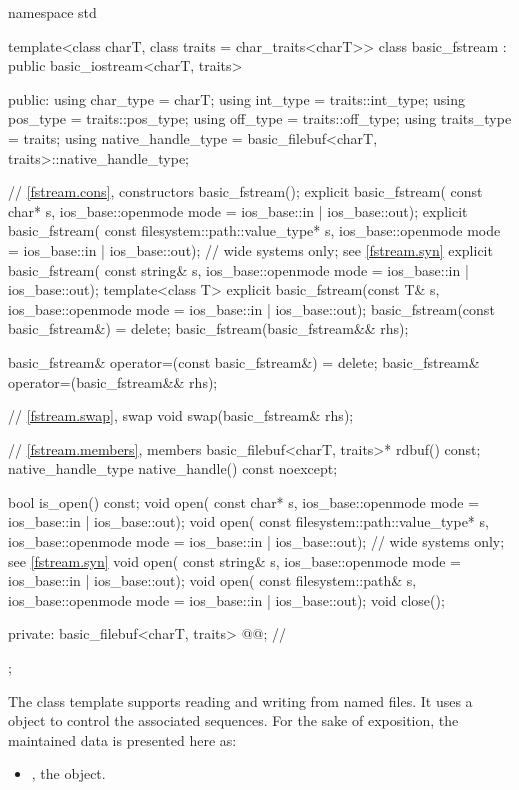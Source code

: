 %
\begin{codeblock}
namespace std {
  template<class charT, class traits = char_traits<charT>>
  class basic_fstream : public basic_iostream<charT, traits> {
  public:
    using char_type   = charT;
    using int_type    = traits::int_type;
    using pos_type    = traits::pos_type;
    using off_type    = traits::off_type;
    using traits_type = traits;
    using native_handle_type = basic_filebuf<charT, traits>::native_handle_type;

    // \ref{fstream.cons}, constructors
    basic_fstream();
    explicit basic_fstream(
      const char* s,
      ios_base::openmode mode = ios_base::in | ios_base::out);
    explicit basic_fstream(
      const filesystem::path::value_type* s,
      ios_base::openmode mode = ios_base::in | ios_base::out);  // wide systems only; see \ref{fstream.syn}
    explicit basic_fstream(
      const string& s,
      ios_base::openmode mode = ios_base::in | ios_base::out);
    template<class T>
      explicit basic_fstream(const T& s, ios_base::openmode mode = ios_base::in | ios_base::out);
    basic_fstream(const basic_fstream&) = delete;
    basic_fstream(basic_fstream&& rhs);

    basic_fstream& operator=(const basic_fstream&) = delete;
    basic_fstream& operator=(basic_fstream&& rhs);

    // \ref{fstream.swap}, swap
    void swap(basic_fstream& rhs);

    // \ref{fstream.members}, members
    basic_filebuf<charT, traits>* rdbuf() const;
    native_handle_type native_handle() const noexcept;

    bool is_open() const;
    void open(
      const char* s,
      ios_base::openmode mode = ios_base::in | ios_base::out);
    void open(
      const filesystem::path::value_type* s,
      ios_base::openmode mode = ios_base::in | ios_base::out);  // wide systems only; see \ref{fstream.syn}
    void open(
      const string& s,
      ios_base::openmode mode = ios_base::in | ios_base::out);
    void open(
      const filesystem::path& s,
      ios_base::openmode mode = ios_base::in | ios_base::out);
    void close();

  private:
    basic_filebuf<charT, traits> @@;    // \expos
  };
}
\end{codeblock}

\pnum
The
class template
supports reading and writing from named files.
It uses a
object to control the associated sequences.
For the sake of exposition, the maintained data is presented here as:
\begin{itemize}
\item
{}, the  object.
\end{itemize}

